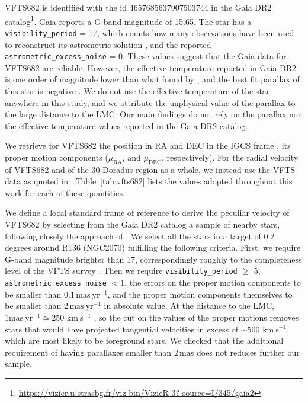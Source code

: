 \documentclass[apjl,twocolumn]{emulateapj}
\newcommand{\kms}{{\,\mathrm{km\ s^{-1}}}}
\DeclareRobustCommand{\Tabref}[1]{Table~\ref{#1}}
\begin{document}
VFTS682 is identified with the id 4657685637907503744 in the Gaia DR2
catalog\footnote{\url{https://vizier.u-strasbg.fr/viz-bin/VizieR-3?-source=I/345/gaia2}}. Gaia
reports a G-band magnitude of 15.65. The star has a
\texttt{visibility\_period} = 17, which counts how many observations have
been used to reconstruct its astrometric solution
\citep[][]{lindengren:18}, and the reported
\texttt{astrometric\_excess\_noise} = 0. These values suggest that the Gaia
data for VFTS682 are reliable. However, the effective temperature
reported in Gaia DR2 is one order of magnitude lower than what found by
\cite{bestenlehner:11}, and the best fit parallax of this star is
negative \citep[see, e.g.,][]{hogg:18}. We do not use the effective temperature of the star anywhere
in this study, and we attribute the unphysical value of the parallax
to the large distance to the LMC. Our main findings do not rely on the
parallax nor the effective temperature values reported in the Gaia DR2
catalog.

We retrieve for VFTS682 the position in RA and DEC
in the IGCS frame \cite[][]{brown:18}, its
proper motion components ($\mu_\mathrm{RA}$, and $\mu_\mathrm{DEC}$,
respectively). For the radial velocity of VFTS682 and of the 30 Doradus
region as a whole, we instead use the VFTS data
as quoted in \cite{bestenlehner:11}. \Tabref{tab:vfts682} lists the values adopted throughout
this work for each of these quantities.


We define a local standard frame of reference to derive the peculiar velocity
of VFTS682 by selecting from the Gaia DR2 catalog a sample of nearby
stars, following closely the approach of \cite{lennon:18}.
We select all the stars in a target of 0.2 degrees around R136
(NGC2070) fulfilling the following criteria. First, we require G-band
magnitude brighter than 17, correspondingly roughly to the
completeness level of the VFTS survey \citep[here we implicitly assume
G$\sim$V,][]{evans:11}. Then we require \texttt{visibility\_period} $\geq$ 5,
\texttt{astrometric\_excess\_noise} $< 1$, the errors on the proper
motion components to be smaller than 0.1\,$\mathrm{mas\ yr^{-1}}$,
and the proper motion components themselves to be smaller than
2\,$\mathrm{mas\ yr^{-1}}$ in absolute value. At the distance to the
LMC, $1\mathrm{mas\ yr^{-1}}\simeq250\,\kms$ \citep[e.g.,][]{lennon:18}, so the cut on the values
of the proper motions removes stars that would have projected
tangential velocities in excess of $\sim$500\,$\kms$, which are most
likely to be foreground stars. We checked that the additional
requirement of having parallaxes smaller than $2\,\mathrm{mas}$ does
not reduces further our sample. 
\end{document}
